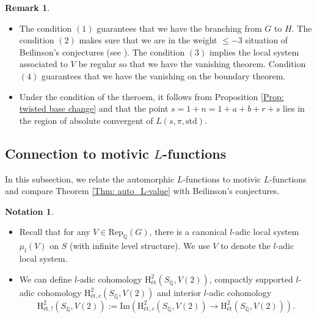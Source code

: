 \documentclass[11pt, a4paper]{amsart}
\theoremstyle{plain}
\theoremstyle{definition}
\newtheorem{remark}[theorem]{Remark}
\newtheorem{notation}[theorem]{Notation}
\numberwithin{equation}{section}
\def\QQ{\mathbb{Q}}
\begin{document}
\begin{remark}
\label{remark: after auto L-value}
    \begin{itemize}
        \item 
        The condition $(1)$ guarantees that we have the branching from $G$ to $H$. The condition $(2)$ makes sure that we are in the weight $\le -3$ situation of Beilinson's conjectures (see \cite[Conjecture (6.1)]{Nekovar94}). The condition $(3)$ implies the local system associated to $V$ be regular so that we have the vanishing theorem. Condition $(4)$ guarantees that we have the vanishing on the boundary theorem. 
        \item Under the condition of the theroem, it follows from Proposition \ref{Prop: twisted base change} and \cite[Page 151]{GJ72} that the point $s = 1 + n = 1 + a + b + r + s$ lies in the region of absolute convergent of $L(s, \pi, \mathrm{std})$. 
    \end{itemize}
\end{remark}

\subsection{Connection to motivic $L$-functions}
\label{SS: conenction to motivic L-function}
In this subsection, we relate the automorphic $L$-functions to motivic $L$-functions and compare Theorem \ref{Thm: auto_L-value} with Beilinson's conjectures. 

\begin{notation}
    \begin{itemize}
        \item Recall that for any $V \in \mathrm{Rep}_{\QQ}(G)$, there is a canonical $l$-adic local system $\mu_{l}(V)$ on $S$ (with infinite level structure). We use $V$ to denote the $l$-adic local system. 
        \item We can define $l$-adic cohomology $\mathrm{H}_{\text{\'et}}^{2}(S_{\overline{\QQ}}, V(2))$, compactly supported $l$-adic cohomology $\mathrm{H}_{\text{\'et}, c}^{2}(S_{\overline{\QQ}}, V(2))$ and interior $l$-adic cohomology 
        \begin{equation*}
            \mathrm{H}_{\text{\'et}, !}^{2}(S_{\overline{\QQ}}, V(2)) := \mathrm{Im}(\mathrm{H}_{\text{\'et}, c}^{2}(S_{\overline{\QQ}}, V(2)) \rightarrow \mathrm{H}_{\text{\'et}}^{2}(S_{\overline{\QQ}}, V(2))). 
        \end{equation*}
    \end{itemize}
\end{notation}
\end{document}
